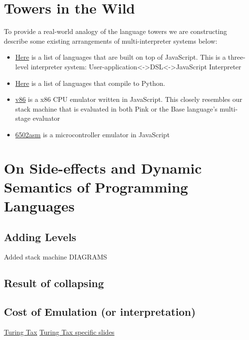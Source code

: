 \documentclass[fleqn]{article}
\theoremstyle{definition}
\begin{document}
\section{Towers in the Wild}
To provide a real-world analogy of the language towers we are constructing describe some existing arrangements of multi-interpreter systems below:
\begin{itemize}
	\item \href{https://github.com/jashkenas/coffeescript/wiki/List-of-languages-that-compile-to-JS}{Here} is a list of languages that are built on top of JavaScript. This is a three-level interpreter system: User-application<->DSL<->JavaScript Interpreter
	\item \href{https://github.com/vindarel/languages-that-compile-to-python#other-languages-that-target-the-python-platform}{Here} is a list of languages that compile to Python.
	\item \href{https://github.com/copy/v86}{v86} is a x86 CPU emulator written in JavaScript. This closely resembles our stack machine that is evaluated in both Pink or the Base language's multi-stage evaluator
	\item \href{http://6502asm.com/}{6502asm} is a microcontroller emulator in JavaScript
\end{itemize}

\section{On Side-effects and Dynamic Semantics of Programming Languages}
\subsection{Adding Levels}
Added stack machine
DIAGRAMS

\subsection{Result of collapsing}

\subsection{Cost of Emulation (or interpretation)}
\cite{steil2004dynamic}
\href{http://materials.dagstuhl.de/files/17/17061/17061.PaulH.J.Kelly.Slides.pdf}{Turing Tax}
\href{https://www.doc.ic.ac.uk/~phjk/AdvancedCompArchitecture/Lectures/pdfs/Ch01-TuringTaxDiscussionV02.pdf}{Turing Tax specific slides}
\end{document}
